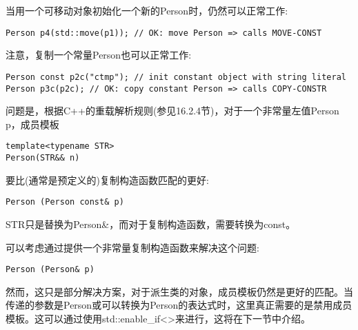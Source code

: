 当用一个可移动对象初始化一个新的Person时，仍然可以正常工作:

\begin{lstlisting}[style=styleCXX]
Person p4(std::move(p1)); // OK: move Person => calls MOVE-CONST
\end{lstlisting}

注意，复制一个常量Person也可以正常工作:

\begin{lstlisting}[style=styleCXX]
Person const p2c("ctmp"); // init constant object with string literal
Person p3c(p2c); // OK: copy constant Person => calls COPY-CONSTR
\end{lstlisting}

问题是，根据C++的重载解析规则(参见16.2.4节)，对于一个非常量左值Person p，成员模板

\begin{lstlisting}[style=styleCXX]
template<typename STR>
Person(STR&& n)
\end{lstlisting}

要比(通常是预定义的)复制构造函数匹配的更好:

\begin{lstlisting}[style=styleCXX]
Person (Person const& p)
\end{lstlisting}

STR只是替换为Person\&，而对于复制构造函数，需要转换为const。

可以考虑通过提供一个非常量复制构造函数来解决这个问题:

\begin{lstlisting}[style=styleCXX]
Person (Person& p)
\end{lstlisting}

然而，这只是部分解决方案，对于派生类的对象，成员模板仍然是更好的匹配。当传递的参数是Person或可以转换为Person的表达式时，这里真正需要的是禁用成员模板。这可以通过使用std::enable\_if<>来进行，这将在下一节中介绍。
































